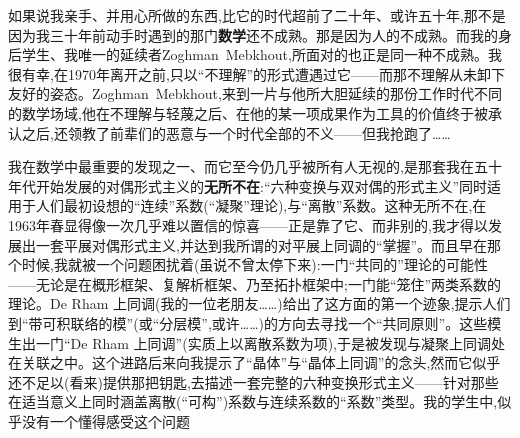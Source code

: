如果说我亲手、并用心所做的东西,比它的时代超前了二十年、或许五十年,那不是因为我三十年前动手时遇到的那门\textbf{数学}还不成熟。那是因为人的不成熟。而我的身后学生、我唯一的延续者Zoghman~Mebkhout,所面对的也正是同一种不成熟。我很有幸,在1970年离开之前,只以“不理解”的形式遭遇过它——而那不理解从未卸下友好的姿态。Zoghman~Mebkhout,来到一片与他所大胆延续的那份工作时代不同的数学场域,他在不理解与轻蔑之后、在他的某一项成果作为工具的价值终于被承认之后,还领教了前辈们的恶意与一个时代全部的不义——但我抢跑了……

我在数学中最重要的发现之一、而它至今仍几乎被所有人无视的,是那套我在五十年代开始发展的对偶形式主义的\textbf{无所不在}:“六种变换与双对偶的形式主义”同时适用于人们最初设想的“连续”系数(“凝聚”理论),与“离散”系数。这种无所不在,在1963年春显得像一次几乎难以置信的惊喜——正是靠了它、而非别的,我才得以发展出一套平展对偶形式主义,并达到我所谓的对平展上同调的“掌握”。而且早在那个时候,我就被一个问题困扰着(虽说不曾太停下来):一门“共同的”理论的可能性——无论是在概形框架、复解析框架、乃至拓扑框架中;一门能“笼住”两类系数的理论。De Rham 上同调(我的一位老朋友……)给出了这方面的第一个迹象,提示人们到“带可积联络的模”(或“分层模”,或许……)的方向去寻找一个“共同原则”。这些模生出一门“De Rham 上同调”(实质上以离散系数为项),于是被发现与凝聚上同调处在关联之中。这个进路后来向我提示了“晶体”与“晶体上同调”的念头,然而它似乎还不足以(看来)提供那把钥匙,去描述一套完整的六种变换形式主义——针对那些在适当意义上同时涵盖离散(“可构”)系数与连续系数的“系数”类型。我的学生中,似乎没有一个懂得感受这个问题
